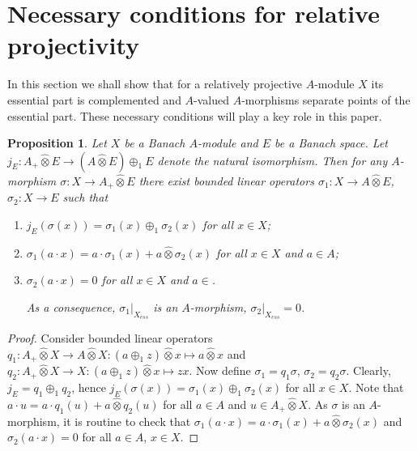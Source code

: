 \documentclass[12pt]{article}
\newtheorem{proposition}[theorem]{Proposition}
\newcommand{\projtens}{\mathbin{\widehat{\otimes}}}
\begin{document}

\section{Necessary conditions for relative
  projectivity}\label{NecessaryConditions}

In this section we shall show that for a relatively projective $A$-module $X$
its essential part is complemented and $A$-valued $A$-morphisms separate points
of the essential part. These necessary conditions will play a key role in this
paper.

\begin{proposition}\label{MorphDecomp} Let $X$ be a Banach $A$-module and $E$ be
    a Banach space. Let $j_E:A_+\projtens E\to (A\projtens E)\oplus_1 E$ denote
    the natural isomorphism. Then for any $A$-morphism $\sigma:X\to A_+\projtens
        E$ there exist bounded linear operators $\sigma_1:X\to A\projtens E$,
    $\sigma_2:X\to E$ such that

    \begin{enumerate}[label = (\roman*)]
        \item $j_E(\sigma(x))=\sigma_1(x)\oplus_1 \sigma_2(x)$ for all $x\in X$;
        \item $\sigma_1(a\cdot x)=a\cdot \sigma_1(x)+a\projtens \sigma_2(x)$ for
              all $x\in X$ and $a\in A$;
        \item $\sigma_2(a\cdot x)=0$ for all $x\in X$ and $a\in $.

              \noindent
              As a consequence, $\sigma_1|_{X_{ess}}$ is an $A$-morphism,
              $\sigma_2|_{X_{ess}}=0$.
    \end{enumerate}
\end{proposition}
\begin{proof} Consider bounded linear operators $q_1:A_+\projtens X\to
        A\projtens X: (a\oplus_1 z)\projtens x\mapsto a\projtens x$ and
    $q_2:A_+\projtens X\to X: (a\oplus_1 z)\projtens x\mapsto z x$. Now
    define $\sigma_1=q_1\sigma$, $\sigma_2=q_2\sigma$. Clearly,
    $j_E=q_1\oplus_1 q_2$, hence $j_E(\sigma(x))=\sigma_1(x)\oplus_1
        \sigma_2(x)$ for all $x\in X$. Note that $a\cdot u=a\cdot
        q_1(u)+a\projtens q_2(u)$ for all $a\in A$ and $u\in A_+\projtens X$. As
    $\sigma$ is an $A$-morphism, it is routine to check that
    $\sigma_1(a\cdot x)=a\cdot \sigma_1(x)+a\projtens \sigma_2(x)$ and
    $\sigma_2(a\cdot x)=0$ for all $a\in A$, $x\in X$.
\end{proof}
\end{document}
